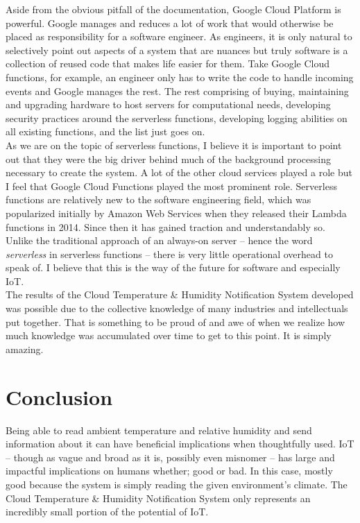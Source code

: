 \documentclass{article}
\begin{document}
Aside from the obvious pitfall of the documentation, Google Cloud Platform is powerful. Google manages and reduces a lot of work that would otherwise be placed as responsibility for a software engineer. As engineers, it is only natural to selectively point out aspects of a system that are nuances but truly software is a collection of reused code that makes life easier for them. Take Google Cloud functions, for example, an engineer only has to write the code to handle incoming events and Google manages the rest. The rest comprising of buying, maintaining and upgrading hardware to host servers for computational needs, developing security practices around the serverless functions, developing logging abilities on all existing functions, and the list just goes on.\\

As we are on the topic of serverless functions, I believe it is important to point out that they were the big driver behind much of the background processing necessary to create the system. A lot of the other cloud services played a role but I feel that Google Cloud Functions played the most prominent role. Serverless functions are relatively new to the software engineering field, which was popularized initially by Amazon Web Services when they released their Lambda functions in 2014. Since then it has gained traction and understandably so. Unlike the traditional approach of an always-on server -- hence the word \textit{serverless} in serverless functions -- there is very little operational overhead to speak of. I believe that this is the way of the future for software and especially IoT.\\

The results of the Cloud Temperature \& Humidity Notification System developed was possible due to the collective knowledge of many industries and intellectuals put together. That is something to be proud of and awe of when we realize how much knowledge was accumulated over time to get to this point. It is simply amazing.

\section{Conclusion}
Being able to read ambient temperature and relative humidity and send information about it can have beneficial implications when thoughtfully used. IoT -- though as vague and broad as it is, possibly even misnomer -- has large and impactful implications on humans whether; good or bad. In this case, mostly good because the system is simply reading the given environment's climate. The Cloud Temperature \& Humidity Notification System only represents an incredibly small portion of the potential of IoT.
\end{document}

